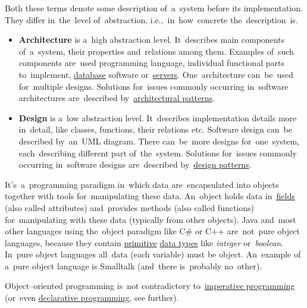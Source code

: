 \label{architecturedesign}
Both these terms denote some description of~a~system before its implementation. They differ in~the~level of~abstraction, i.e.,~in~how~concrete the~description~is.
\begin{itemize}
    \item \textbf{Architecture} is a~high abstraction level. It~describes main components of~a~system, their properties and~relations among them. Examples of~such components are~used programming language, individual functional parts to~implement, \hyperref[databases]{database} software or~\hyperref[server]{servers}. One~architecture can~be~used for~multiple designs. Solutions for~issues commonly occurring in~software architectures are~described by~\hyperref[architecturalpatterns]{architectural patterns}.
    \item \textbf{Design} is a~low abstraction level. It~describes implementation details more in~detail, like classes, functions, their relations etc. Software design can~be described by~an~UML diagram. There can~be~more designs for~one~system, each~describing different part of~the~system. Solutions for~issues commonly occurring in~software designs are~described by~\hyperref[designpatterns]{design patterns}.
\end{itemize}

\label{objectorientedprogramming}
It's~a~programming paradigm in~which data are~encapsulated into objects together with tools for~manipulating these data. An~object holds data in~\hyperref[variablefieldproperty]{fields} (also called attributes) and~provides methods (also called functions) for~manipulating with these data (typically from other objects). Java and~most other languages using the~object paradigm like C\# or C++ are~not~pure object languages, because they contain \hyperref[javadatatypes]{primitive} \hyperref[datatypes]{data types} like \textit{integer} or~\textit{boolean}. In~pure object languages all~data (each variable) must be object. An~example of a~pure object language is Smalltalk (and~there is~probably no~other).

\warning Object--oriented programming is~not contradictory to~\hyperref[imperativeprogramming]{imperative programming} (or~even \hyperref[declarativeprogramming]{declarative programming}, see further).


